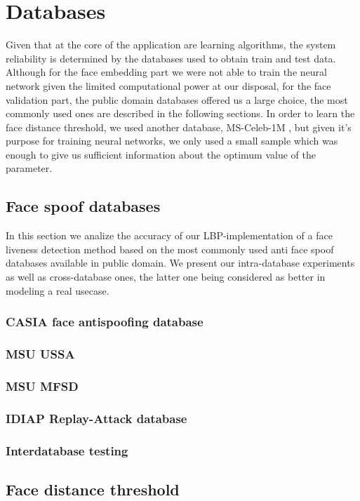 \chapter{Databases}
Given that at the core of the application are learning algorithms, the system reliability is determined by the databases used to obtain train and test data. Although for the face embedding part we were not able to train the neural network given the limited computational power at our disposal, for the face validation part, the public domain databases offered us a large choice, the most commonly used ones are described in the following sections. In order to learn the face distance threshold, we used another database, MS-Celeb-1M \cite{guo2016msceleb}, but given it's purpose for training neural networks, we only used a small sample which was enough to give us sufficient information about the optimum value of the parameter.
\section{Face spoof databases}
In this section we analize the accuracy of our LBP-implementation of a face liveness detection method based on the most commonly used anti face spoof databases available in public domain. We present our intra-database experiments as well as cross-database ones, the latter one being considered as better in modeling a real usecase.
\subsection{CASIA face antispoofing database }
\subsection{MSU USSA}
\subsection{MSU MFSD}
\subsection{IDIAP Replay-Attack database}
\subsection{Interdatabase testing}
\section{Face distance threshold}
